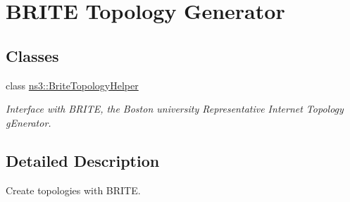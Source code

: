 \hypertarget{group__brite}{}\section{B\+R\+I\+TE Topology Generator}
\label{group__brite}
\subsection*{Classes}
\begin{DoxyCompactItemize}
\item 
class \hyperlink{classns3_1_1BriteTopologyHelper}{ns3\+::\+Brite\+Topology\+Helper}
\begin{DoxyCompactList}\small\item\em Interface with B\+R\+I\+TE, the Boston university Representative Internet Topology g\+Enerator. \end{DoxyCompactList}\end{DoxyCompactItemize}


\subsection{Detailed Description}
Create topologies with B\+R\+I\+TE. 